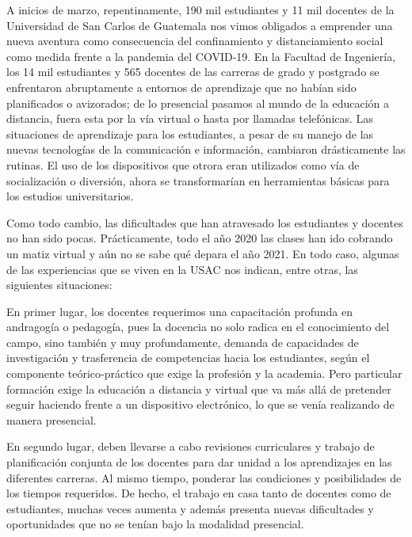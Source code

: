 \documentclass[12pt,spanish,Letterpaper,openany]{book}
\begin{document}
A inicios de marzo, repentinamente, 190 mil estudiantes y 11 mil docentes de la Universidad de San Carlos de Guatemala nos vimos obligados a emprender una nueva aventura como consecuencia del confinamiento y distanciamiento social como medida frente a la pandemia del COVID‐19. En la Facultad de Ingeniería, los 14 mil estudiantes y 565 docentes de las carreras de grado y postgrado se enfrentaron abruptamente a entornos de aprendizaje que no habían sido planificados o avizorados; de lo presencial pasamos al mundo de la educación a distancia, fuera esta por la vía virtual o hasta por llamadas telefónicas. Las situaciones de aprendizaje para los estudiantes, a pesar de su manejo de las nuevas tecnologías de la comunicación e información, cambiaron drásticamente las rutinas. El uso de los dispositivos que otrora eran utilizados como vía de socialización o diversión, ahora se transformarían en herramientas básicas para los estudios universitarios.

Como todo cambio, las dificultades que han atravesado los estudiantes y docentes no han sido pocas. Prácticamente, todo el año 2020 las clases han ido cobrando un matiz virtual y aún no se sabe qué depara el año 2021. En todo caso, algunas de las experiencias que se viven en la USAC nos indican, entre otras, las siguientes situaciones:

En primer lugar, los docentes requerimos una capacitación profunda en andragogía o pedagogía, pues la docencia no solo radica en el conocimiento del campo, sino también y muy profundamente, demanda de capacidades de investigación y trasferencia de competencias hacia los estudiantes, según el componente teórico‐práctico que exige la profesión y la academia. Pero particular formación exige la educación a distancia y virtual que va más allá de pretender seguir haciendo frente a un dispositivo electrónico, lo que se venía realizando de manera presencial.

En segundo lugar, deben llevarse a cabo revisiones curriculares y trabajo de planificación conjunta de los docentes para dar unidad a los aprendizajes en las diferentes carreras. Al mismo tiempo, ponderar las condiciones y posibilidades de los tiempos requeridos. De hecho, el trabajo en casa tanto de docentes como de estudiantes, muchas veces aumenta y además presenta nuevas dificultades y oportunidades que no se tenían bajo la modalidad presencial.
\end{document}
